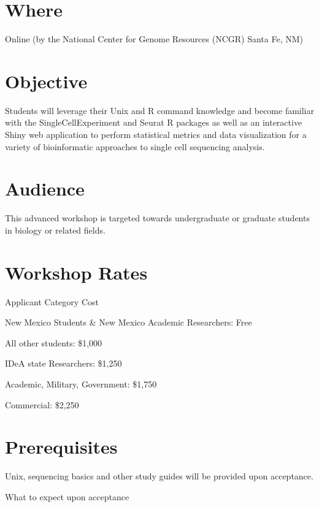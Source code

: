 \documentclass[
]{book}
\begin{document}
\hypertarget{where-1}{%
\section{Where}\label{where-1}}

Online (by the National Center for Genome Resources (NCGR) Santa Fe, NM)

\hypertarget{objective-1}{%
\section{Objective}\label{objective-1}}

Students will leverage their Unix and R command knowledge and become familiar with the SingleCellExperiment and Seurat R packages as well as an interactive Shiny web application to perform statistical metrics and data visualization for a variety of bioinformatic approaches to single cell sequencing analysis.

\hypertarget{audience-1}{%
\section{Audience}\label{audience-1}}

This advanced workshop is targeted towards undergraduate or graduate students in biology or related fields.

\hypertarget{workshop-rates-1}{%
\section{Workshop Rates}\label{workshop-rates-1}}

Applicant Category Cost

New Mexico Students \& New Mexico Academic Researchers:
Free

All other students:
\$1,000

IDeA state Researchers:
\$1,250

Academic, Military, Government:
\$1,750

Commercial:
\$2,250

\hypertarget{prerequisites-1}{%
\section{Prerequisites}\label{prerequisites-1}}

Unix, sequencing basics and other study guides will be provided upon acceptance.

What to expect upon acceptance
\end{document}
